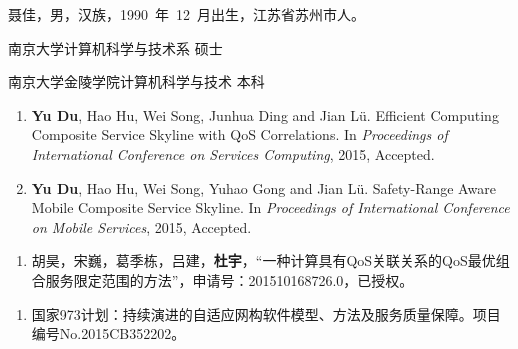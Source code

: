 \documentclass[twoside, master]{NJUthesis}
\theoremstyle{plain}
\begin{document}


\vspace{1ex}
\noindent 聂佳，男，汉族，1990~年~12~月出生，江苏省苏州市人。
\vspace{2ex}

\begin{description}[labelindent=0em, leftmargin=8em, style=sameline]
\item[2013.9～2016.6] 南京大学计算机科学与技术系 \hfill 硕士
\item[2009.9～2013.6] 南京大学金陵学院计算机科学与技术 \hfill 本科
\end{description}



\begin{enumerate}[label=\arabic*., labelindent=0em, leftmargin=*]
	\item \textbf{Yu Du}, Hao Hu, Wei Song, Junhua Ding and Jian L\"{u}. Efficient Computing Composite Service Skyline with QoS Correlations. In \emph{Proceedings of International Conference on Services Computing}, 2015, Accepted.
    \item \textbf{Yu Du}, Hao Hu, Wei Song, Yuhao Gong and Jian L\"{u}. Safety-Range Aware Mobile Composite Service Skyline. In \emph{Proceedings of International Conference on Mobile Services}, 2015, Accepted.
\end{enumerate}


\begin{enumerate}[label=\arabic*., labelindent=0em, leftmargin=*]
	\item 胡昊，宋巍，葛季栋，吕建，\textbf{杜宇}，``一种计算具有QoS关联关系的QoS最优组合服务限定范围的方法''，申请号：201510168726.0，已授权。
\end{enumerate}

\vspace{4ex}

\begin{enumerate}[label=\arabic*., labelindent=0em, leftmargin=*]
	\item 国家973计划：持续演进的自适应网构软件模型、方法及服务质量保障。项目编号No.2015CB352202。
\end{enumerate}

\end{document}

